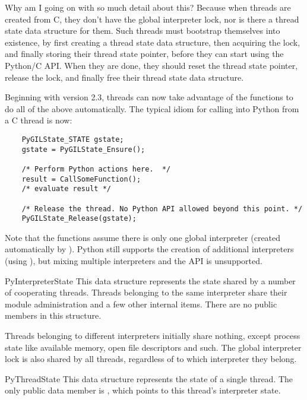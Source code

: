 Why am I going on with so much detail about this?  Because when
threads are created from C, they don't have the global interpreter
lock, nor is there a thread state data structure for them.  Such
threads must bootstrap themselves into existence, by first creating a
thread state data structure, then acquiring the lock, and finally
storing their thread state pointer, before they can start using the
Python/C API.  When they are done, they should reset the thread state
pointer, release the lock, and finally free their thread state data
structure.

Beginning with version 2.3, threads can now take advantage of the 
 functions to do all of the above
automatically.  The typical idiom for calling into Python from a C
thread is now:

\begin{verbatim}
    PyGILState_STATE gstate;
    gstate = PyGILState_Ensure();

    /* Perform Python actions here.  */
    result = CallSomeFunction();
    /* evaluate result */

    /* Release the thread. No Python API allowed beyond this point. */
    PyGILState_Release(gstate);
\end{verbatim}

Note that the  functions assume there is
only one global interpreter (created automatically by
).  Python still supports the creation of
additional interpreters (using ), but
mixing multiple interpreters and the  API is
unsupported.

\begin{ctypedesc}{PyInterpreterState}
  This data structure represents the state shared by a number of
  cooperating threads.  Threads belonging to the same interpreter
  share their module administration and a few other internal items.
  There are no public members in this structure.

  Threads belonging to different interpreters initially share nothing,
  except process state like available memory, open file descriptors
  and such.  The global interpreter lock is also shared by all
  threads, regardless of to which interpreter they belong.
\end{ctypedesc}

\begin{ctypedesc}{PyThreadState}
  This data structure represents the state of a single thread.  The
  only public data member is , which points to this thread's interpreter state.
\end{ctypedesc}


